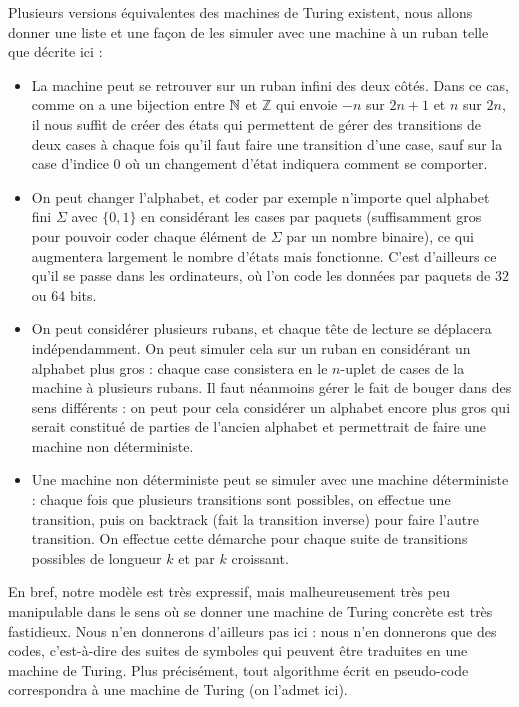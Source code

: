 Plusieurs versions équivalentes des machines de Turing existent, nous allons donner une liste et une façon de les simuler avec une machine à un ruban telle que décrite ici :
\begin{itemize}[label=$\bullet$]
    \item La machine peut se retrouver sur un ruban infini des deux côtés. Dans ce cas, comme on a une bijection entre $\mathbb{N}$ et $\mathbb Z$ qui envoie $-n$ sur $2n+1$ et $n$ sur $2n$, il nous suffit de créer des états qui permettent de gérer des transitions de deux cases à chaque fois qu'il faut faire une transition d'une case, sauf sur la case d'indice $0$ où un changement d'état indiquera comment se comporter.
    \item On peut changer l'alphabet, et coder par exemple n'importe quel alphabet fini $\Sigma$ avec $\{0,1\}$ en considérant les cases par paquets (suffisamment gros pour pouvoir coder chaque élément de $\Sigma$ par un nombre binaire), ce qui augmentera largement le nombre d'états mais fonctionne. C'est d'ailleurs ce qu'il se passe dans les ordinateurs, où l'on code les données par paquets de $32$ ou $64$ bits.
    \item On peut considérer plusieurs rubans, et chaque tête de lecture se déplacera indépendamment. On peut simuler cela sur un ruban en considérant un alphabet plus gros : chaque case consistera en le $n$-uplet de cases de la machine à plusieurs rubans. Il faut néanmoins gérer le fait de bouger dans des sens différents : on peut pour cela considérer un alphabet encore plus gros qui serait constitué de parties de l'ancien alphabet et permettrait de faire une machine non déterministe.
    \item Une machine non déterministe peut se simuler avec une machine déterministe : chaque fois que plusieurs transitions sont possibles, on effectue une transition, puis on \og backtrack\fg{} (fait la transition inverse) pour faire l'autre transition. On effectue cette démarche pour chaque suite de transitions possibles de longueur $k$ et par $k$ croissant.
\end{itemize}

En bref, notre modèle est très expressif, mais malheureusement très peu manipulable dans le sens où se donner une machine de Turing concrète est très fastidieux. Nous n'en donnerons d'ailleurs pas ici : nous n'en donnerons que des codes, c'est-à-dire des suites de symboles qui peuvent être traduites en une machine de Turing. Plus précisément, tout algorithme écrit en pseudo-code correspondra à une machine de Turing (on l'admet ici).

